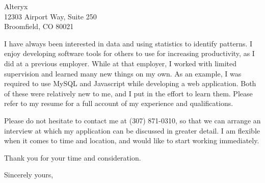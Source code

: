 \documentclass[11pt]{letter} %
\begin{document}
\begin{letter}{
Alteryx \\
12303 Airport Way, Suite 250 \\
Broomfield, CO 80021 }

I have always been interested in data and using statistics to identify patterns. I enjoy developing software tools for others to use for increasing productivity, as I did at a previous employer. While at that employer, I worked with limited supervision and learned many new things on my own. As an example, I was required to use MySQL and Javascript while developing a web application. Both of these were relatively new to me, and I put in the effort to learn them. Please refer to my resume for a full account of my experience and qualifications.  
 

Please do not hesitate to contact me at (307) 871-0310, so that we can arrange an interview at which my application can be discussed in greater detail. I am flexible when it comes to time and location, and would like to start working immediately.

Thank you for your time and consideration.

\closing{Sincerely yours,}




\end{letter}
\end{document}
